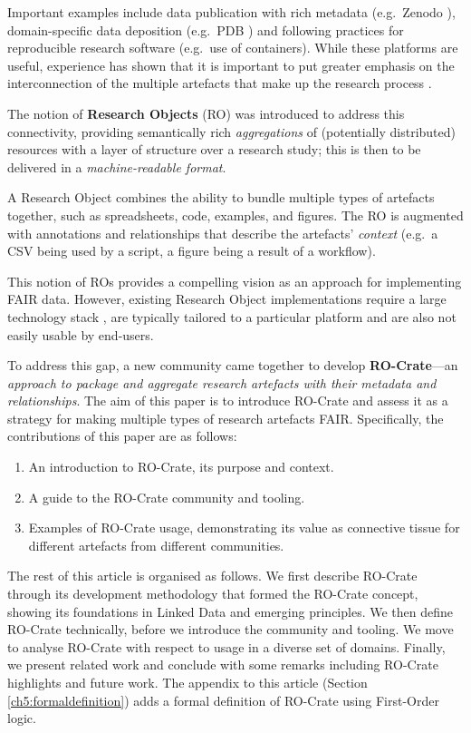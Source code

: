 Important examples include data publication with rich metadata
(e.g.~Zenodo \cite{Dillen 2019a}),
domain-specific data deposition (e.g.~PDB
\cite{Berman 2007}) and following
practices for reproducible research software
\cite{Sandve 2013} (e.g.~use
of containers). While these platforms are useful, experience has shown
that it is important to put greater emphasis on the interconnection of
the multiple artefacts that make up the research process
\cite{Koesten 2021}.

The notion of \textbf{Research Objects}
\cite{Bechhofer 2013}
(\acrshort{RO}) was introduced to address this connectivity, providing semantically
rich \emph{aggregations} of (potentially distributed) resources with a
layer of structure over a research study; this is then to be delivered
in a \emph{machine-readable format}.

A Research Object combines the ability to bundle multiple types of
artefacts together, such as spreadsheets, code, examples, and figures.
The RO is augmented with annotations and relationships that describe the
artefacts' \emph{context} (e.g.~a \acrshort{CSV} being used by a script, a figure
being a result of a workflow).

This notion of ROs provides a compelling vision as an approach for
implementing FAIR data. However, existing Research Object
implementations require a large technology stack
\cite{Belhajjame 2015}, are
typically tailored to a particular platform and are also not easily
usable by end-users.

To address this gap, a new community came together
\cite{Ó Carragáin 2019a} to develop
\textbf{RO-Crate}---an \emph{approach to package and aggregate
research artefacts with their metadata and relationships}. The aim of
this paper is to introduce RO-Crate and assess it as a strategy for
making multiple types of research artefacts FAIR. Specifically, the
contributions of this paper are as follows:

\begin{enumerate}
  \item An introduction to RO-Crate, its purpose and context.
  \item A guide to the RO-Crate community and tooling.
  \item Examples of RO-Crate usage, demonstrating its value as connective tissue for different artefacts from different communities.
\end{enumerate}

The rest of this article is organised as follows. We first describe
RO-Crate through its development methodology that formed the RO-Crate
concept, showing its foundations in Linked Data and emerging principles.
We then define RO-Crate technically, before we introduce the community
and tooling. We move to analyse RO-Crate with respect to usage in a
diverse set of domains. Finally, we present related work and conclude
with some remarks including RO-Crate highlights and future work. The
appendix to this article (Section \vref{ch5:formaldefinition}) adds a formal definition of RO-Crate using First-Order logic.


